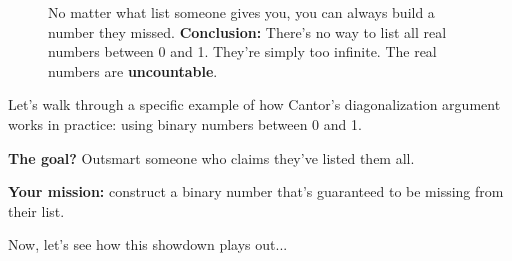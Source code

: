 \begin{figure}[H]
\begin{center}
\end{center}

\caption{No matter what list someone gives you, you can always build a number they missed. \textbf{Conclusion:} There’s no way to list all real numbers between 0 and 1. They’re simply too infinite. The real numbers are \textbf{uncountable}.}
\end{figure}










Let’s walk through a specific example of how Cantor’s diagonalization argument works in practice: using binary numbers between 0 and 1. 

\textbf{The goal?} Outsmart someone who claims they’ve listed them all. 

\textbf{Your mission:} construct a binary number that’s guaranteed to be missing from their list.

Now, let’s see how this showdown plays out...

